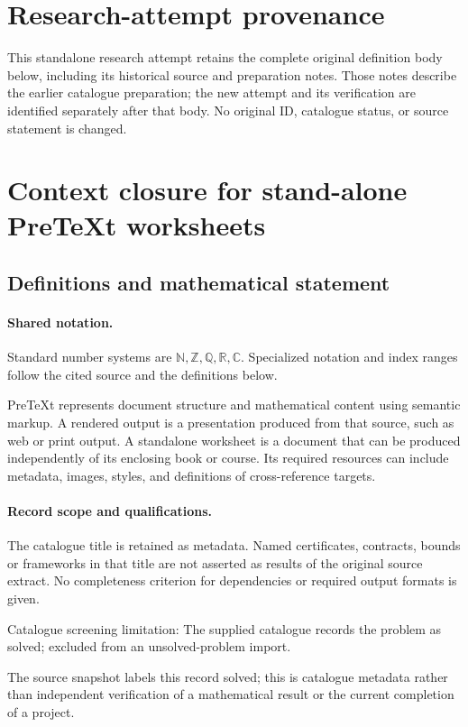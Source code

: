 \documentclass[11pt]{article}
\begin{document}
\section*{Research-attempt provenance}
This standalone research attempt retains the complete original definition body below,
including its historical source and preparation notes. Those notes describe the
earlier catalogue preparation; the new attempt and its verification are identified
separately after that body. No original ID, catalogue status, or source statement is changed.

\section{Context closure for stand-alone PreTeXt worksheets}\label{statement}

\subsection{Definitions and mathematical statement}

\paragraph{Shared notation.}Standard number systems are $\mathbb N,\mathbb Z,\mathbb Q,\mathbb R,\mathbb C$. Specialized notation and index ranges follow the cited source and the definitions below.


PreTeXt represents document structure and mathematical content using semantic markup. A rendered output is a presentation produced from that source, such as web or print output. A standalone worksheet is a document that can be produced independently of its enclosing book or course. Its required resources can include metadata, images, styles, and definitions of cross-reference targets.
\paragraph{Record scope and qualifications.}
The catalogue title is retained as metadata. Named certificates, contracts, bounds or frameworks in that title are not asserted as results of the original source extract.
No completeness criterion for dependencies or required output formats is given.

Catalogue screening limitation: The supplied catalogue records the problem as solved; excluded from an unsolved-problem import.

The source snapshot labels this record solved; this is catalogue metadata rather than independent verification of a mathematical result or the current completion of a project.
\end{document}
